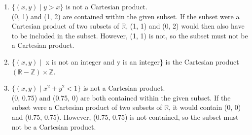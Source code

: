 \documentclass{article}
\begin{document}
\begin{enumerate}
\begin{enumerate}
            \item $\{(x, y) \mid y > x\}$ is not a Cartesian product.\\
            (0, 1) and (1, 2) are contained within the given subset. If the subset were a Cartesian product of two subsets of $\mathbb{R}$, (1, 1) and (0, 2) would then also have to be included in the subset. However, (1, 1) is not, so the subset must not be a Cartesian product.
            \item \{$(x, y) \mid $ x is not an integer and y is an integer\} is the Cartesian product $(\mathbb{R} - \mathbb{Z}) \times \mathbb{Z}$.
            \item $\{(x, y) \mid x^{2} + y^{2} < 1\}$ is not a Cartesian product.\\
            (0, 0.75) and (0.75, 0) are both contained within the given subset. If the subset were a Cartesian product of two subsets of $\mathbb{R}$, it would contain (0, 0) and (0.75, 0.75). However, (0.75, 0.75) is not contained, so the subset must not be a Cartesian product.
      \end{enumerate}
\end{enumerate}
\end{document}
